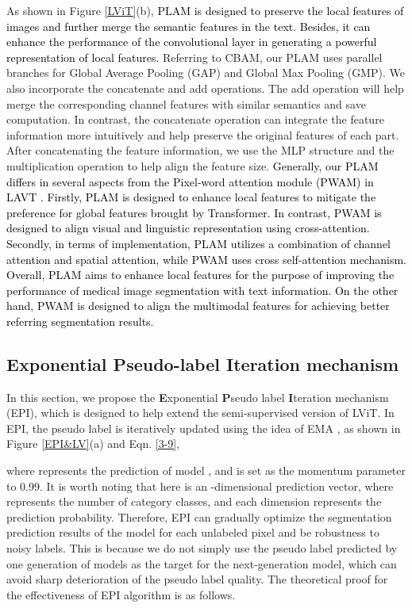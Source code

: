 \documentclass[lettersize,journal]{IEEEtran}
\begin{document}
As shown in Figure \ref{LViT}(b), \textcolor{black}{PLAM is designed to preserve the local features of images and further merge the semantic features in the text. Besides, it can enhance the performance of the convolutional layer in generating a powerful representation of local features.} Referring to CBAM\cite{36woo2018cbam}, our PLAM uses parallel branches for Global Average Pooling (GAP) and Global Max Pooling (GMP). We also incorporate the concatenate and add operations. The add operation will help merge the corresponding channel features with similar semantics and save computation. In contrast, the concatenate operation can integrate the feature information more intuitively and help preserve the original features of each part. After concatenating the feature information, we use the MLP structure and the multiplication operation to help align the feature size.
\textcolor{black}{
Generally, our PLAM differs in several aspects from the Pixel-word attention module (PWAM) in LAVT \cite{Yang22CVPR}. Firstly, PLAM is designed to enhance local features to mitigate the preference for global features brought by Transformer. In contrast, PWAM is designed to align visual and linguistic representation using cross-attention. Secondly, in terms of implementation,  PLAM utilizes a combination of channel attention and spatial attention, while PWAM uses cross self-attention mechanism. Overall, PLAM aims to enhance local features for the purpose of improving the performance of medical image segmentation with text information. On the other hand, PWAM is designed to align the multimodal features for achieving better referring segmentation results. 
}


\subsection{\textbf{E}xponential \textbf{P}seudo-label \textbf{I}teration mechanism}
In this section, we propose the \textbf{E}xponential \textbf{P}seudo label \textbf{I}teration mechanism (EPI), which is designed to help extend the semi-supervised version of LViT. In EPI, the pseudo label is iteratively updated using the idea of EMA \cite{7grill2020bootstrap}, as shown in Figure \ref{EPI&LV}(a) and Eqn. \ref{3-9},

where  represents the prediction of model , and  is set as the momentum parameter to 0.99. It is worth noting that here  is an -dimensional prediction vector, where  represents the number of category classes, and each dimension represents the prediction probability. Therefore, EPI can gradually optimize the segmentation prediction results of the model for each unlabeled pixel and be robustness to noisy labels. This is because we do not simply use the pseudo label predicted by one generation of models as the target for the next-generation model, which can avoid sharp deterioration of the pseudo label quality. The theoretical proof for the effectiveness of EPI algorithm is as follows.
\end{document}
